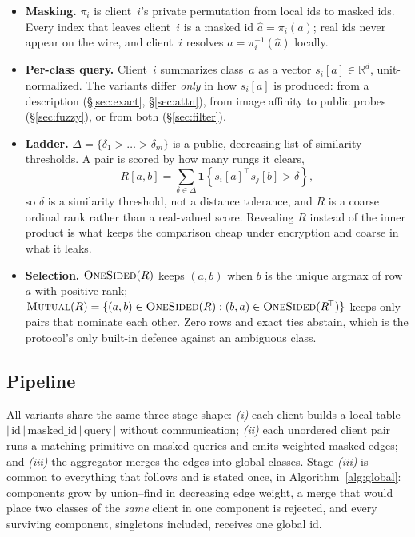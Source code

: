 \documentclass[conference]{IEEEtran}
\newcommand{\Real}{\mathbb{R}}
\newcommand{\Ind}{\mathbf{1}}
\newcommand{\Mutual}{\textsc{Mutual}}
\newcommand{\OneSided}{\textsc{OneSided}}
\begin{document}
\begin{itemize}
\item \textbf{Masking.} $\pi_i$ is client~$i$'s private permutation from
local ids to masked ids. Every index that leaves client~$i$ is a masked
id $\hat a=\pi_i(a)$; real ids never appear on the wire, and client~$i$
resolves $a=\pi_i^{-1}(\hat a)$ locally.
\item \textbf{Per-class query.} Client~$i$ summarizes class~$a$ as a
vector $s_i[a]\in\Real^{d}$, unit-normalized. The variants differ
\emph{only} in how $s_i[a]$ is produced: from a description
(\S\ref{sec:exact}, \S\ref{sec:attn}), from image affinity to public
probes (\S\ref{sec:fuzzy}), or from both (\S\ref{sec:filter}).
\item \textbf{Ladder.} $\Delta=\{\delta_1>\dots>\delta_m\}$ is a public,
decreasing list of similarity thresholds. A pair is scored by how many
rungs it clears,
\begin{equation}
R[a,b]=\sum_{\delta\in\Delta}\Ind\!\left\{s_i[a]^{\!\top} s_j[b]>\delta\right\},
\label{eq:rank}
\end{equation}
so $\delta$ is a similarity threshold, not a distance tolerance, and $R$
is a coarse ordinal rank rather than a real-valued score. Revealing $R$
instead of the inner product is what keeps the comparison cheap under
encryption and coarse in what it leaks.
\item \textbf{Selection.} $\OneSided(R)$ keeps $(a,b)$ when $b$ is the
unique argmax of row~$a$ with positive rank; $\Mutual(R)=\{(a,b)\in
\OneSided(R):(b,a)\in\OneSided(R^{\!\top})\}$ keeps only pairs that
nominate each other. Zero rows and exact ties abstain, which is the
protocol's only built-in defence against an ambiguous class.
\end{itemize}

\subsection*{Pipeline}
All variants share the same three-stage shape:
\emph{(i)} each client builds a local table
$|\,\text{id}\,|\,\text{masked\_id}\,|\,\text{query}\,|$ without
communication; \emph{(ii)} each unordered client pair runs a matching
primitive on masked queries and emits weighted masked edges; and
\emph{(iii)} the aggregator merges the edges into global classes. Stage
\emph{(iii)} is common to everything that follows and is stated once, in
Algorithm~\ref{alg:global}: components grow by union--find in decreasing
edge weight, a merge that would place two classes of the \emph{same}
client in one component is rejected, and every surviving component,
singletons included, receives one global id.
\end{document}
